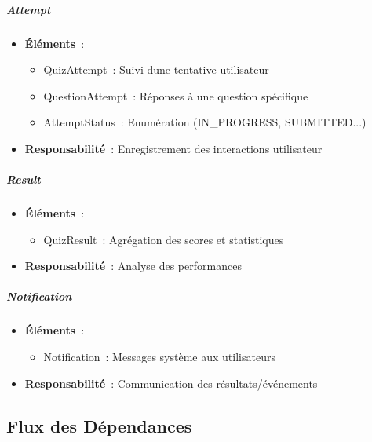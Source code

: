 \documentclass[12pt,a4paper,twoside]{report}
\begin{document}
\hypertarget{attempt}{%
\subparagraph{Attempt}\label{attempt}}

\begin{itemize}
\item
  \textbf{Éléments}~:

  \begin{itemize}
  \item
    QuizAttempt~: Suivi d\textquotesingle une tentative utilisateur
  \item
    QuestionAttempt~: Réponses à une question spécifique
  \item
    AttemptStatus~: Enumération (IN\_PROGRESS, SUBMITTED...)
  \end{itemize}
\item
  \textbf{Responsabilité}~: Enregistrement des interactions utilisateur
\end{itemize}

\hypertarget{result}{%
\subparagraph{Result}\label{result}}

\begin{itemize}
\item
  \textbf{Éléments}~:

  \begin{itemize}
  \item
    QuizResult~: Agrégation des scores et statistiques
  \end{itemize}
\item
  \textbf{Responsabilité}~: Analyse des performances
\end{itemize}

\hypertarget{notification}{%
\subparagraph{Notification}\label{notification}}

\begin{itemize}
\item
  \textbf{Éléments}~:

  \begin{itemize}
  \item
    Notification~: Messages système aux utilisateurs
  \end{itemize}
\item
  \textbf{Responsabilité}~: Communication des résultats/événements
\end{itemize}

\hypertarget{flux-des-duxe9pendances}{%
\subsection{Flux des Dépendances}\label{flux-des-duxe9pendances}}
\end{document}

